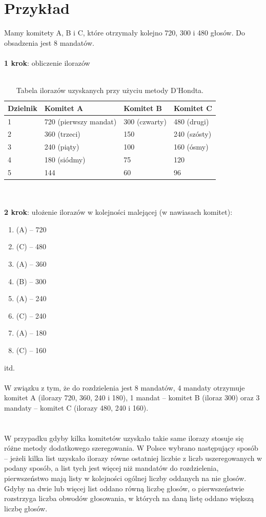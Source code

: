 \documentclass[12pt,a4paper,titlepage]{report}
\begin{document}
\section{Przykład}
Mamy komitety A, B i C, które otrzymały kolejno 720, 300 i 480 głosów. Do obsadzenia jest 8 mandatów. \\ \\
\textbf{1 krok}: obliczenie ilorazów \\ \\
\begin{table}[h]
\begin{tabular}{|l|l|l|l|} \hline
Dzielnik & Komitet A & Komitet B & Komitet C \\
\hline
1 & 720 (pierwszy mandat) & 300 (czwarty) & 480 (drugi) \\
\hline
2 & 360 (trzeci) & 150 & 240 (szósty) \\
\hline
3 & 240 (piąty) & 100 & 160 (ósmy) \\ 
\hline
4 & 180 (siódmy) & 75 & 120 \\ \hline
5 & 144 & 60 & 96 \\
\hline

\end{tabular}
\caption{Tabela ilorazów uzyskanych przy użyciu metody D'Hondta.}
\end{table}\\ \\
\textbf{2 krok}: ułożenie ilorazów w kolejności malejącej (w nawiasach komitet):
\begin{enumerate}
\item (A) – 720
\item (C) – 480
\item (A) – 360
\item (B) – 300
\item (A) – 240
\item (C) – 240
\item (A) – 180
\item (C) – 160
\end{enumerate} 
itd. \\ 
 \\
W związku z tym, że do rozdzielenia jest 8 mandatów, 4 mandaty otrzymuje komitet A (ilorazy 720, 360, 240 i 180), 1 mandat – komitet B (iloraz 300) oraz 3 mandaty – komitet C (ilorazy 480, 240 i 160). \\ \\ \\
W przypadku gdyby kilka komitetów uzyskało takie same ilorazy stosuje się różne metody dodatkowego szeregowania. W Polsce wybrano następujący sposób – jeżeli kilka list uzyskało ilorazy równe ostatniej liczbie z liczb uszeregowanych w podany sposób, a list tych jest więcej niż mandatów do rozdzielenia, pierwszeństwo mają listy w kolejności ogólnej liczby oddanych na nie głosów. Gdyby na dwie lub więcej list oddano równą liczbę głosów, o pierwszeństwie rozstrzyga liczba obwodów głosowania, w których na daną listę oddano większą liczbę głosów. \\
\end{document}
